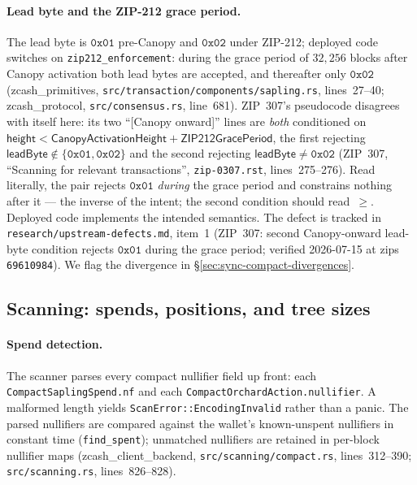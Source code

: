 \documentclass[11pt,a4paper]{article}
\theoremstyle{definition}
\begin{document}
\paragraph{Lead byte and the ZIP-212 grace period.} The lead byte is
$\mathtt{0x01}$ pre-Canopy and $\mathtt{0x02}$ under ZIP-212; deployed code
switches on \texttt{zip212\_enforcement}: during the grace period of
$32{,}256$ blocks after Canopy activation both lead bytes are accepted, and
thereafter only $\mathtt{0x02}$ (\textsf{zcash\_primitives},
\texttt{src/transaction/components/sapling.rs}, lines~27--40;
\textsf{zcash\_protocol}, \texttt{src/consensus.rs}, line~681). ZIP~307's
pseudocode disagrees with itself here: its two ``[Canopy onward]'' lines are
\emph{both} conditioned on $\mathsf{height} < \mathsf{CanopyActivationHeight}
+ \mathsf{ZIP212GracePeriod}$, the first rejecting $\mathsf{leadByte} \notin
\{\mathtt{0x01}, \mathtt{0x02}\}$ and the second rejecting
$\mathsf{leadByte} \neq \mathtt{0x02}$ (ZIP~307, ``Scanning for relevant
transactions'', \texttt{zip-0307.rst}, lines~275--276). Read literally, the
pair rejects $\mathtt{0x01}$ \emph{during} the grace period and constrains
nothing after it --- the inverse of the intent; the second condition should
read~$\geq$. Deployed code implements the intended semantics. The defect
is tracked in \texttt{research/upstream-defects.md}, item~1 (ZIP~307:
second Canopy-onward lead-byte condition rejects $\mathtt{0x01}$ during
the grace period; verified 2026-07-15 at \textsf{zips}
\texttt{69610984}). We flag the
divergence in \S\ref{sec:sync-compact-divergences}.

\subsection{Scanning: spends, positions, and tree sizes}%
\label{sec:sync-compact-scan}

\paragraph{Spend detection.} The scanner parses every compact nullifier
field up front: each \texttt{CompactSaplingSpend.nf} and each
\texttt{CompactOrchardAction.}\allowbreak\texttt{nullifier}. A malformed
length yields \texttt{ScanError::}\allowbreak\texttt{EncodingInvalid}
rather than a panic. The parsed nullifiers are compared against the
wallet's known-unspent nullifiers in constant time (\texttt{find\_spent});
unmatched nullifiers are retained in per-block nullifier maps
(\textsf{zcash\_client\_backend}, \texttt{src/scanning/compact.rs},
lines~312--390; \texttt{src/scanning.rs}, lines~826--828).
\end{document}
